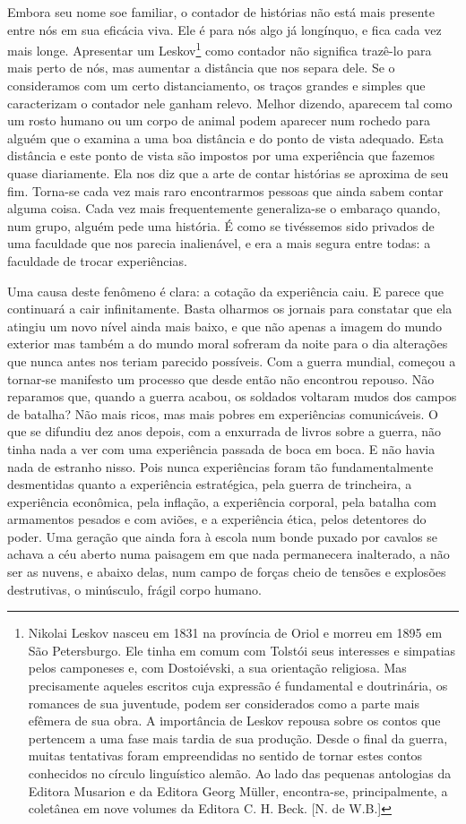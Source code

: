 Embora seu nome soe familiar, o contador de histórias não está mais
presente entre nós em sua eficácia viva. Ele é para nós algo já
longínquo, e fica cada vez mais longe. Apresentar um Leskov\footnote{Nikolai
  Leskov nasceu em 1831 na província de Oriol e morreu em 1895 em São
  Petersburgo. Ele tinha em comum com Tolstói seus interesses e
  simpatias pelos camponeses e, com Dostoiévski, a sua orientação
  religiosa. Mas precisamente aqueles escritos cuja expressão é
  fundamental e doutrinária, os romances de sua juventude, podem ser
  considerados como a parte mais efêmera de sua obra. A importância de
  Leskov repousa sobre os contos que pertencem a uma fase mais tardia de
  sua produção. Desde o final da guerra, muitas tentativas foram
  empreendidas no sentido de tornar estes contos conhecidos no círculo
  linguístico alemão. Ao lado das pequenas antologias da Editora
  Musarion e da Editora Georg Müller, encontra-se, principalmente, a
  coletânea em nove volumes da Editora C. H. Beck. {[}N. de W.B.{]}}
como contador não significa trazê-lo para mais perto de nós, mas
aumentar a distância que nos separa dele. Se o consideramos com um certo
distanciamento, os traços grandes e simples que caracterizam o contador
nele ganham relevo. Melhor dizendo, aparecem tal como um rosto humano ou
um corpo de animal podem aparecer num rochedo para alguém que o examina
a uma boa distância e do ponto de vista adequado. Esta distância e este
ponto de vista são impostos por uma experiência que fazemos quase
diariamente. Ela nos diz que a arte de contar histórias se aproxima de
seu fim. Torna-se cada vez mais raro encontrarmos pessoas que ainda
sabem contar alguma coisa. Cada vez mais frequentemente generaliza-se o
embaraço quando, num grupo, alguém pede uma história. É como se
tivéssemos sido privados de uma faculdade que nos parecia inalienável, e
era a mais segura entre todas: a faculdade de trocar experiências.

Uma causa deste fenômeno é clara: a cotação da experiência caiu. E
parece que continuará a cair infinitamente. Basta olharmos os jornais
para constatar que ela atingiu um novo nível ainda mais baixo, e que não
apenas a imagem do mundo exterior mas também a do mundo moral sofreram
da noite para o dia alterações que nunca antes nos teriam parecido
possíveis. Com a guerra mundial, começou a tornar-se manifesto um
processo que desde então não encontrou repouso. Não reparamos que,
quando a guerra acabou, os soldados voltaram mudos dos campos de
batalha? Não mais ricos, mas mais pobres em experiências comunicáveis. O
que se difundiu dez anos depois, com a enxurrada de livros sobre a
guerra, não tinha nada a ver com uma experiência passada de boca em
boca. E não havia nada de estranho nisso. Pois nunca experiências foram
tão fundamentalmente desmentidas quanto a experiência estratégica, pela
guerra de trincheira, a experiência econômica, pela inflação, a
experiência corporal, pela batalha com armamentos pesados e com aviões,
e a experiência ética, pelos detentores do poder. Uma geração que ainda
fora à escola num bonde puxado por cavalos se achava a céu aberto numa
paisagem em que nada permanecera inalterado, a não ser as nuvens, e
abaixo delas, num campo de forças cheio de tensões e explosões
destrutivas, o minúsculo, frágil corpo humano.

